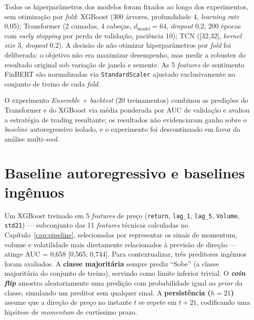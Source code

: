 Todos os hiperparâmetros dos modelos foram fixados ao longo dos experimentos, sem otimização por \textit{fold}: XGBoost (300 árvores, profundidade 4, \textit{learning rate} 0,05); Transformer (2 camadas, 4 cabeças, $d_\text{model}=64$, \textit{dropout} 0,2, 200 épocas com \textit{early stopping} por perda de validação, paciência 10); TCN ([32,32], \textit{kernel size} 3, \textit{dropout} 0,2). A decisão de não otimizar hiperparâmetros por \textit{fold} foi deliberada: o objetivo não era maximizar desempenho, mas medir a robustez do resultado original sob variação de janela e semente. As 5 \textit{features} de sentimento FinBERT são normalizadas via \texttt{StandardScaler} ajustado exclusivamente no conjunto de treino de cada \textit{fold}.

O experimento \textit{Ensemble + backtest} (20 treinamentos) combinou as predições do Transformer e do XGBoost via média ponderada por AUC de validação e avaliou a estratégia de trading resultante; os resultados não evidenciaram ganho sobre o \textit{baseline} autoregressivo isolado, e o experimento foi descontinuado em favor da análise multi-\textit{seed}.

\section{Baseline autoregressivo e baselines ingênuos}

Um XGBoost \cite{chen2016} treinado em 5 \textit{features} de preço (\texttt{return}, \texttt{lag\_1}, \texttt{lag\_5}, \texttt{Volume}, \texttt{std21}) --- subconjunto das 11 \textit{features} técnicas calculadas no Capítulo~\ref{cap:pipeline}, selecionadas por representar os sinais de momentum, volume e volatilidade mais diretamente relacionados à previsão de direção --- atinge AUC = 0,658 [0,565; 0,744]. Para contextualizar, três preditores ingênuos foram avaliados. A \textbf{classe majoritária} sempre prediz ``Sobe'' (a classe majoritária do conjunto de treino), servindo como limite inferior trivial. O \textbf{\textit{coin flip}} amostra aleatoriamente uma predição com probabilidade igual ao \textit{prior} da classe, simulando um preditor sem qualquer sinal. A \textbf{persistência ($h=21$)} assume que a direção de preço no instante $t$ se repete em $t+21$, codificando uma hipótese de \textit{momentum} de curtíssimo prazo.

